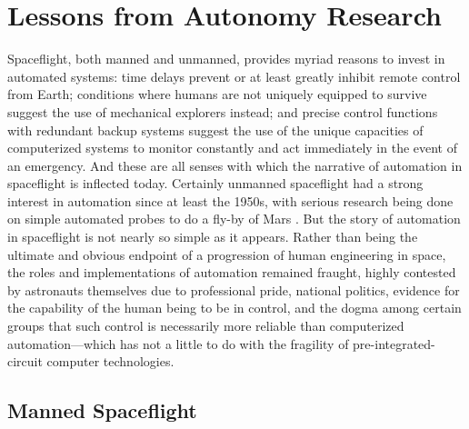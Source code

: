 






\section{Lessons from Autonomy Research}

Spaceflight, both manned and unmanned, provides myriad reasons to
invest in automated systems: time delays prevent or at least greatly
inhibit remote control from Earth; conditions where humans are not
uniquely equipped to survive suggest the use of mechanical explorers
instead; and precise control functions with redundant backup systems
suggest the use of the unique capacities of computerized systems to
monitor constantly and act immediately in the event of an emergency.
And these are all senses with which the narrative of automation in
spaceflight is inflected today. Certainly unmanned spaceflight had a
strong interest in automation since at least the 1950s, with serious
research being done on simple automated probes to do a fly-by of
Mars \cite[p. 1]{battin}. But the story of automation in spaceflight is
not nearly so simple as it appears. Rather than being the ultimate and
obvious endpoint of a progression of human engineering in space, the
roles and implementations of automation remained fraught, highly
contested by astronauts themselves due to professional pride, national
politics, evidence for the capability of the human being to be in
control, and the dogma among certain groups that such control is
necessarily more reliable than computerized automation---which has not
a little to do with the fragility of pre-integrated-circuit computer
technologies.

\subsection{Manned Spaceflight}

